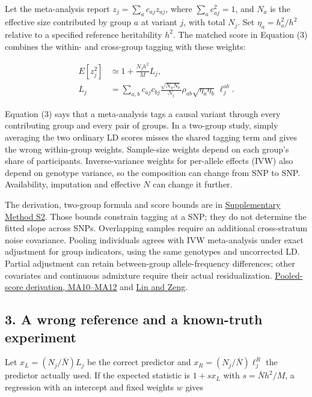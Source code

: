 \documentclass[11pt,a4paper]{article}
\let\reportsection\subsection
\newif\ifinsupplement
\renewcommand{\subsection}[1]{\clearpage
  \ifstrequal{#1}{Supplementary Methods}{\insupplementtrue
    \fancyhead[R]{\small\sffamily Supplementary methods}}{}
  \reportsection{#1}}
\begin{document}
Let the meta-analysis report \(z_j=\sum_a c_{aj}z_{aj}\), where \(\sum_a c_{aj}^2=1\), and \(N_a\) is the effective size contributed by group \(a\) at variant \(j\), with total \(N_j\). Set \(\eta_a=h_a^2/h^2\) relative to a specified reference heritability \(h^2\). The matched score in Equation (3) combines the within- and cross-group tagging with these weights:

\[
\begin{aligned}
 E[z_j^2]&\simeq 1+\frac{N_jh^2}{M} L_j,\\
 L_j&=\sum_{a,b}c_{aj}c_{bj}\frac{\sqrt{N_aN_b}}{N_j}
      \rho_{ab}\sqrt{\eta_a\eta_b}\,\ell_j^{ab}.
\end{aligned}\tag{3}
\]

Equation (3) says that a meta-analysis tags a causal variant through every contributing group and every pair of groups. In a two-group study, simply averaging the two ordinary LD scores misses the shared tagging term and gives the wrong within-group weights. Sample-size weights depend on each group's share of participants. Inverse-variance weights for per-allele effects (IVW) also depend on genotype variance, so the composition can change from SNP to SNP. Availability, imputation and effective \(N\) can change it further.

The derivation, two-group formula and score bounds are in \hyperref[s2-deriving-the-meta-analysis-score]{Supplementary Method S2}. Those bounds constrain tagging at a SNP; they do not determine the fitted slope across SNPs. Overlapping samples require an additional cross-stratum noise covariance. Pooling individuals agrees with IVW meta-analysis under exact adjustment for group indicators, using the same genotypes and uncorrected LD. Partial adjustment can retain between-group allele-frequency differences; other covariates and continuous admixture require their actual residualization. \href{../docs/MULTI_ANCESTRY.md}{Pooled-score derivation, MA10--MA12} and \href{https://pubmed.ncbi.nlm.nih.gov/19847795/}{Lin and Zeng}.

\subsection{3. A wrong reference and a known-truth experiment}\label{3-a-wrong-reference-and-a-known-truth-experiment}

Let \(x_L=(N_j/\bar N)L_j\) be the correct predictor and \(x_R=(N_j/\bar N)\ell_j^R\) the predictor actually used. If the expected statistic is \(1+s x_L\) with \(s=\bar Nh^2/M\), a regression with an intercept and fixed weights \(w\) gives
\end{document}
